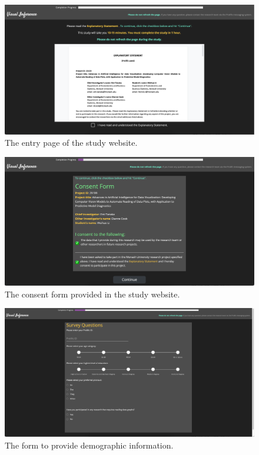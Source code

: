 \documentclass[]{interact}
\theoremstyle{plain}%
\theoremstyle{definition}
\theoremstyle{remark}
\begin{document}
\begin{figure}

{\centering \includegraphics[width=1\linewidth]{figures/message} 

}

\caption{The entry page of the study website.}\label{fig:entry-page}
\end{figure}

\begin{figure}

{\centering \includegraphics[width=1\linewidth]{figures/consent_form} 

}

\caption{The consent form provided in the study website.}\label{fig:consent-form}
\end{figure}

\begin{figure}

{\centering \includegraphics[width=1\linewidth]{figures/metadata} 

}

\caption{The form to provide demographic information.}\label{fig:metadata}
\end{figure}
\end{document}
